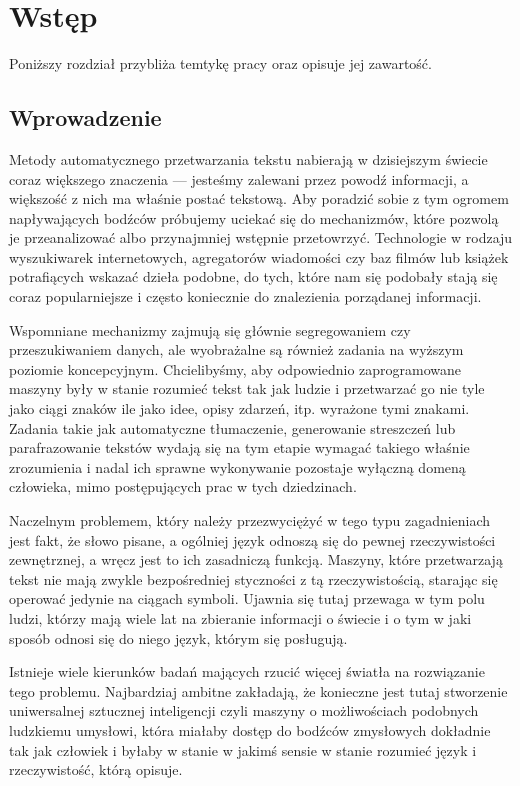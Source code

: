 \documentclass[11pt,a4paper]{article}
\begin{document}
\tableofcontents
\pagebreak

\section{Wstęp}

Poniższy rozdział przybliża temtykę pracy oraz opisuje jej zawartość.

\subsection{Wprowadzenie}

Metody automatycznego przetwarzania tekstu nabierają w dzisiejszym świecie
coraz większego znaczenia --- jesteśmy zalewani przez powodź informacji, a
większość z nich ma właśnie postać tekstową. Aby poradzić sobie z tym ogromem
napływających bodźców próbujemy uciekać się do mechanizmów, które pozwolą je
przeanalizować albo przynajmniej wstępnie przetowrzyć. Technologie w rodzaju
wyszukiwarek internetowych, agregatorów wiadomości czy baz filmów lub książek
potrafiących wskazać dzieła podobne, do tych, które nam się podobały stają się
coraz popularniejsze i często koniecznie do znalezienia porządanej informacji.

Wspomniane mechanizmy zajmują się głównie segregowaniem czy przeszukiwaniem
danych, ale wyobrażalne są również zadania na wyższym poziomie koncepcyjnym.
Chcielibyśmy, aby odpowiednio zaprogramowane maszyny były w stanie rozumieć
tekst tak jak ludzie i przetwarzać go nie tyle jako ciągi znaków ile jako idee,
opisy zdarzeń, itp. wyrażone tymi znakami. Zadania takie jak automatyczne
tłumaczenie, generowanie streszczeń lub parafrazowanie tekstów wydają się na
tym etapie wymagać takiego właśnie zrozumienia i nadal ich sprawne wykonywanie
pozostaje wyłączną domeną człowieka, mimo postępujących prac w tych
dziedzinach.

Naczelnym problemem, który należy przezwyciężyć w tego typu zagadnieniach jest
fakt, że słowo pisane, a ogólniej język odnoszą się do pewnej rzeczywistości
zewnętrznej, a wręcz jest to ich zasadniczą funkcją. Maszyny, które
przetwarzają tekst nie mają zwykle bezpośredniej styczności z tą
rzeczywistością, starając się operować jedynie na ciągach symboli. Ujawnia się
tutaj przewaga w tym polu ludzi, którzy mają wiele lat na zbieranie informacji
o świecie i o tym w jaki sposób odnosi się do niego język, którym się
posługują.

Istnieje wiele kierunków badań mających rzucić więcej światła na rozwiązanie
tego problemu. Najbardziaj ambitne zakładają, że konieczne jest tutaj
stworzenie uniwersalnej sztucznej inteligencji czyli maszyny o możliwościach
podobnych ludzkiemu umysłowi, która miałaby dostęp do bodźców zmysłowych
dokładnie tak jak człowiek i byłaby w stanie w jakimś sensie w stanie rozumieć
język i rzeczywistość, którą opisuje.
\end{document}
